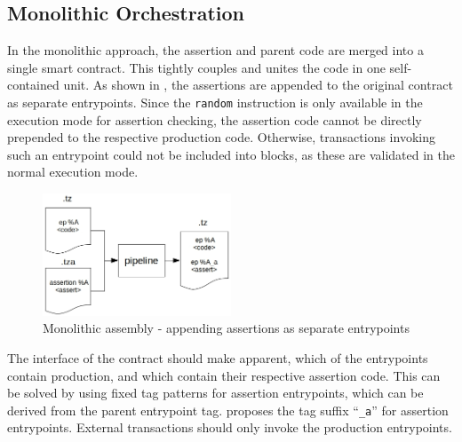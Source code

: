 \subsection{Monolithic Orchestration}\label{sec:monolithic}
In the monolithic approach, the assertion and parent code are merged into a single smart contract. This tightly couples and unites the code in one self-contained unit. As shown in , the assertions are appended to the original contract as separate entrypoints. Since the \texttt{random} instruction is only available in the execution mode for assertion checking, the assertion code cannot be directly prepended to the respective production code. Otherwise, transactions invoking such an entrypoint could not be included into blocks, as these are validated in the normal execution mode.
\begin{figure}[h]
\centering
  \includegraphics[width=0.5\textwidth]{figures/5-offline_tezos/pipeline_output_mono_ep_basic.jpg}
	\caption{Monolithic assembly - appending assertions as separate entrypoints}
	\label{fig:mono_eps}
\end{figure}

The interface of the contract should make apparent, which of the entrypoints contain production, and which contain their respective assertion code. This can be solved by using fixed tag patterns for assertion entrypoints, which can be derived from the parent entrypoint tag.  proposes the tag suffix ``\texttt{\_a}'' for assertion entrypoints. External transactions should only invoke the production entrypoints.

